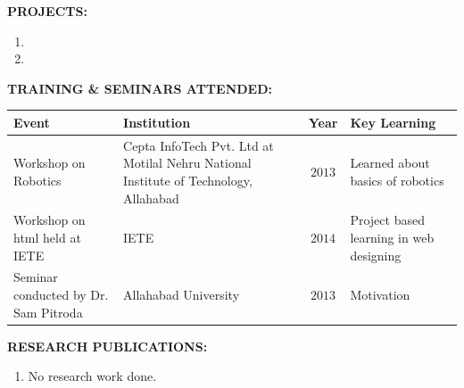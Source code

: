 \documentclass{article}
\begin{document}
\textbf{PROJECTS:}
\begin{enumerate}
	\item
    \item
\end{enumerate}

\textbf{TRAINING \& SEMINARS ATTENDED:}\\
\begin{tabular}{|p{2in}|p{2.5in}|c|p{1.3in}|}
	\hline
	\qquad \qquad \qquad \textbf{Event} & \qquad \qquad \qquad \textbf{Institution} & \textbf{Year} & \qquad \textbf{Key Learning}\\
	\hline
	Workshop on Robotics & Cepta InfoTech Pvt. Ltd at Motilal Nehru National Institute of Technology, Allahabad & $2013$ & Learned about basics of robotics\\
	\hline
	Workshop on html held at IETE & IETE & $2014$ & Project based learning in web designing\\
	\hline
	Seminar conducted by Dr. Sam Pitroda & Allahabad University & $2013$ & Motivation\\
	\hline
\end{tabular} 
\newline 
\newline

\textbf{RESEARCH PUBLICATIONS:}
\begin{enumerate}
	\item No research work done.
\end{enumerate}
\end{document}
